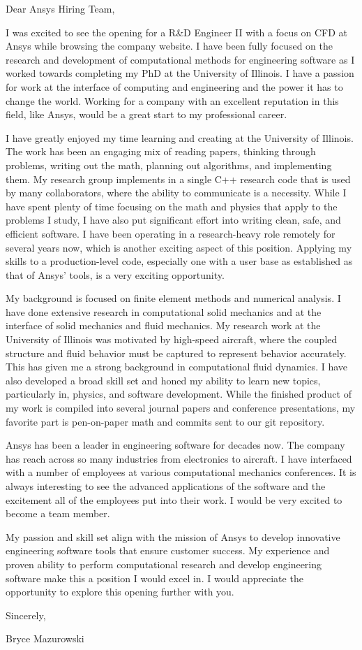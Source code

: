 \documentclass{resume}
\begin{document}
\vspace{0.5in}
Dear Ansys Hiring Team,

I was excited to see the opening for a R\&D Engineer II
with a focus on CFD at Ansys while browsing the company website.
%
I have been fully focused on the research and development of
computational methods for engineering software as I worked towards
completing my PhD at the University of Illinois.
%
I have a passion for work at the interface
of computing and engineering and the power it has to change the world.
%
Working for a company with an excellent reputation in this field, like
Ansys, would be a great start to my professional career.
%

I have greatly enjoyed my time learning and creating at the University
of Illinois.
%
The work has been an engaging mix of reading papers, thinking through
problems, writing out the math, planning out algorithms, and
implementing them.
%
My research group implements in a single C++ research code that
is used by many collaborators, where the ability to communicate
is a necessity. 
%
While I have spent plenty of time focusing on the math and physics
that apply to the problems I study, I have also put significant effort
into writing clean, safe, and efficient software.
%
I have been operating in a research-heavy role remotely for
several years now, which is another exciting aspect of this position.
%
Applying my skills to a production-level code, especially one with a
user base as established as that of Ansys' tools, is a very exciting
opportunity.
%

My background is focused on finite element methods and numerical analysis.
%
I have done extensive research in computational solid mechanics
and at the interface of solid mechanics and fluid mechanics.
%
My research work at the University of Illinois was motivated by
high-speed aircraft, where the coupled structure and fluid behavior
must be captured to represent behavior accurately.
%
This has given me a strong background in computational fluid dynamics.
%
I have also developed a broad skill set and honed my ability to learn new
topics, particularly in, physics, and software development.
%
While the finished product of my work is compiled into several journal
papers and conference presentations, my favorite part is pen-on-paper math
and commits sent to our git repository.
%

Ansys has been a leader in engineering software for decades now.
%
The company has reach across so many industries from electronics to
aircraft.
%
I have interfaced with a number of employees at various computational
mechanics conferences.
%
It is always interesting to see the advanced applications of the
software and the excitement all of the employees put into
their work.
%
I would be very excited to become a team member.
%

My passion and skill set align with the mission of Ansys to develop
innovative engineering software tools that ensure customer success.
%
My experience and proven ability to perform computational research
and develop engineering software make this a position I would excel in.
%
I would appreciate the opportunity to explore this opening further with you.
%


Sincerely,

Bryce Mazurowski
\end{document}
